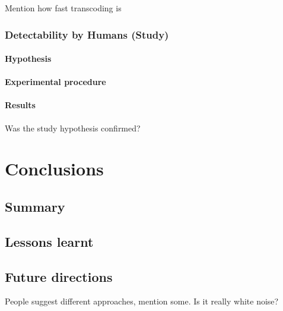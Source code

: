 \documentclass[12pt,british,twoside,notitlepage,usenames,dvipsnames,hypens,final]{report}
\numberwithin{equation}{section}
\numberwithin{figure}{section}
\begin{document}
Mention how fast transcoding is

\subsection{Detectability by Humans (Study)}

\subsubsection{Hypothesis}

\subsubsection{Experimental procedure}

\subsubsection{Results}

Was the study hypothesis confirmed?

\cleardoublepage
\chapter{Conclusions}

\section{Summary}

\section{Lessons learnt}

\section{Future directions}

People suggest different approaches, mention some. Is it really white noise?

\cleardoublepage


\end{document}
